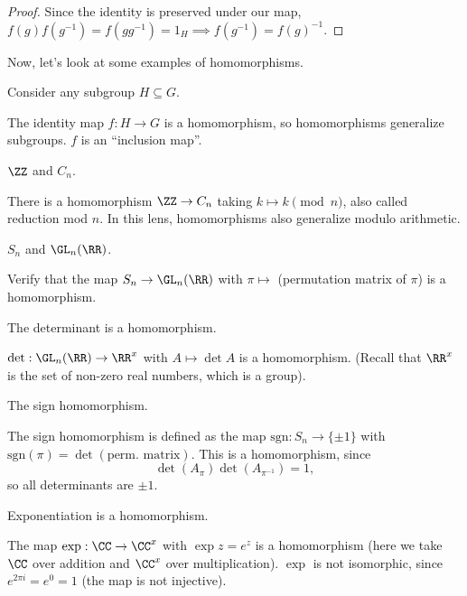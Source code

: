 \begin{proof}
Since the identity is preserved under our map, $f(g)f(g^{-1})=f(gg^{-1}) = 1_H\implies f(g^{-1}) = f(g)^{-1}$.
\end{proof}

Now, let's look at some examples of homomorphisms. 

\begin{example}
\exlabel

Consider any subgroup $H\subseteq G$. 
\end{example}

The identity map $f : H\rightarrow G$ is a homomorphism, so homomorphisms generalize subgroups. $f$ is an ``inclusion map''.  

\begin{example}
\exlabel

$\ZZ$ and $C_n$. 
\end{example}

There is a homomorphism $\ZZ\rightarrow C_n$ taking $k\mapsto k\pmod n$, also called reduction mod $n$. In this lens, homomorphisms also generalize modulo arithmetic. 

\begin{example}
\exlabel

$S_n$ and $\GL_n(\RR)$.
\end{example}

Verify that the map $S_n\rightarrow \GL_n(\RR)$ with $\pi \mapsto$ (permutation matrix of $\pi$) is a homomorphism.

\begin{example}
\exlabel

The determinant is a homomorphism.
\end{example}

$\det : \GL_n(\RR)\rightarrow \RR^x$ with $A\mapsto \det A$ is a homomorphism. (Recall that $\RR^x$ is the set of non-zero real numbers, which is a group).

\begin{example}
\exlabel

The sign homomorphism. 
\end{example}

The sign homomorphism is defined as the map $\text{sgn} : S_n\rightarrow \{\pm 1\}$ with $\text{sgn}(\pi) = \det (\text{perm. matrix})$. This is a homomorphism, since 
\[\det(A_{\pi})\det(A_{\pi^{-1}})=1,\]
so all determinants are $\pm 1$. 

\begin{example}
\exlabel

Exponentiation is a homomorphism. 
\end{example}

The map $\exp: \CC\rightarrow \CC^x$ with $\exp z = e^z$ is a homomorphism (here we take $\CC$ over addition and $\CC^x$ over multiplication). $\exp$ is not isomorphic, since $e^{2\pi i} = e^0 = 1$ (the map is not injective). 